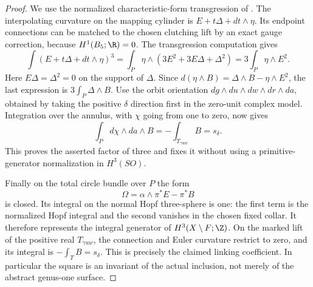 \begin{proof}
We use the normalized characteristic-form transgression of
\citet[Section 3, Propositions 3.2 and 3.8]{ChernSimons1974E}.
The interpolating curvature on the mapping cylinder is
$E+t\Delta+dt\wedge\eta$. Its endpoint connections can be
matched to the chosen clutching lift by an exact gauge correction,
because $H^1(B_5;\R)=0$. The transgression computation gives
\[
 \int(E+t\Delta+dt\wedge\eta)^3
 =\int_P\eta\wedge(3E^2+3E\Delta+\Delta^2)
 =3\int_P\eta\wedge E^2.
\]
Here $E\Delta=\Delta^2=0$ on the support of $\Delta$. Since
$d(\eta\wedge B)=\Delta\wedge B-\eta\wedge E^2$,
the last expression is $3\int_P\Delta\wedge B$.
Use the orbit orientation
$dg\wedge du\wedge dw\wedge dr\wedge da$, obtained by
taking the positive $\delta$ direction first in the zero-unit
complex model. Integration over the annulus, with $\chi$ going
from one to zero, now gives
\[
 \int_P d\chi\wedge da\wedge B
   =-\int_{T_{\gamma uw}}B=s_\delta.
\]
This proves the asserted factor of three and fixes it without
using a primitive-generator normalization in $H^3(SO)$.

Finally on the total circle bundle over $P$ the form
\[
 \Omega=\alpha\wedge\pi^*E-\pi^*B
\]
is closed. Its integral on the normal Hopf three-sphere is one:
the first term is the normalized Hopf integral and the second
vanishes in the chosen fixed collar. It therefore represents
the integral generator of $H^3(X\setminus F;\Z)$. On the marked
lift of the positive real $T_{\gamma uw}$, the connection and
Euler curvature restrict to zero, and its integral is
$-\int_T B=s_\delta$. This is precisely the claimed linking
coefficient. In particular the square is an invariant of the
actual inclusion, not merely of the abstract genus-one surface.
\end{proof}

